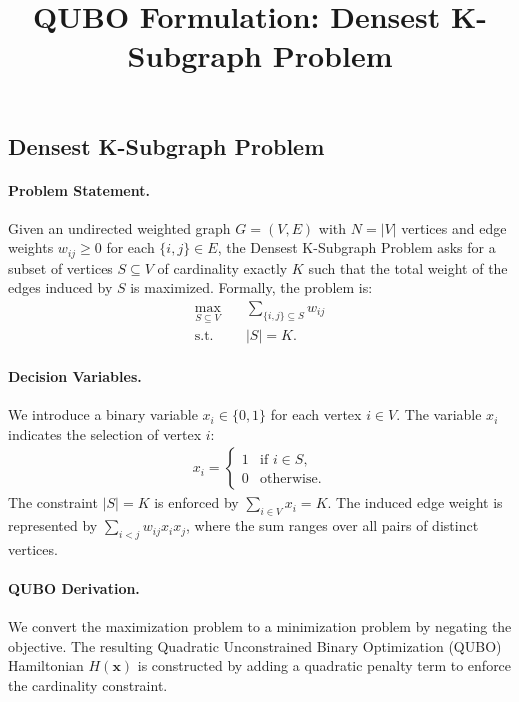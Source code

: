 \documentclass[12pt]{article}
\title{QUBO Formulation: Densest K-Subgraph Problem}
\date{}
\begin{document}
\maketitle

\subsection*{Densest K-Subgraph Problem}

\paragraph{Problem Statement.}
Given an undirected weighted graph $G = (V, E)$ with $N = |V|$ vertices and edge weights $w_{ij} \geq 0$ for each $\{i, j\} \in E$, the Densest K-Subgraph Problem asks for a subset of vertices $S \subseteq V$ of cardinality exactly $K$ such that the total weight of the edges induced by $S$ is maximized. Formally, the problem is:
\begin{align}
    \max_{S \subseteq V} \quad & \sum_{\{i, j\} \subseteq S} w_{ij} \\
    \text{s.t.} \quad & |S| = K.
\end{align}

\paragraph{Decision Variables.}
We introduce a binary variable $x_i \in \{0, 1\}$ for each vertex $i \in V$. The variable $x_i$ indicates the selection of vertex $i$:
\begin{align}
    x_i = 
    \begin{cases}
        1 & \text{if } i \in S, \\
        0 & \text{otherwise}.
    \end{cases}
\end{align}
The constraint $|S| = K$ is enforced by $\sum_{i \in V} x_i = K$. The induced edge weight is represented by $\sum_{i < j} w_{ij} x_i x_j$, where the sum ranges over all pairs of distinct vertices.

\paragraph{QUBO Derivation.}
We convert the maximization problem to a minimization problem by negating the objective. The resulting Quadratic Unconstrained Binary Optimization (QUBO) Hamiltonian $H(\mathbf{x})$ is constructed by adding a quadratic penalty term to enforce the cardinality constraint.
\end{document}
